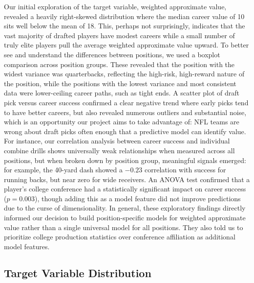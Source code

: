 \documentclass[11pt]{article}
\begin{document}
Our initial exploration of the target variable, weighted approximate value, revealed a heavily right-skewed distribution where the median career value of 10 sits well below the mean of 18. This, perhaps not surprisingly, indicates that the vast majority of drafted players have modest careers while a small number of truly elite players pull the average weighted approximate value upward. To better see and understand the differences between positions, we used a boxplot comparison across position groups. These revealed that the position with the widest variance was quarterbacks, reflecting the high-risk, high-reward nature of the position, while the positions with the lowest variance and most consistent data were lower-ceiling career paths, such as tight ends. A scatter plot of draft pick versus career success confirmed a clear negative trend where early picks tend to have better careers, but also revealed numerous outliers and substantial noise, which is an opportunity our project aims to take advantage of: NFL teams are wrong about draft picks often enough that a predictive model can identify value. For instance, our correlation analysis between career success and individual combine drills shows universally weak relationships when measured across all positions, but when broken down by position group, meaningful signals emerged: for example, the 40-yard dash showed a $-0.23$ correlation with success for running backs, but near zero for wide receivers. An ANOVA test confirmed that a player's college conference had a statistically significant impact on career success ($p = 0.003$), though adding this as a model feature did not improve predictions due to the curse of dimensionality. In general, these exploratory findings directly informed our decision to build position-specific models for weighted approximate value rather than a single universal model for all positions. They also told us to prioritize college production statistics over conference affiliation as additional model features. 


\subsection{Target Variable Distribution}

\end{document}
